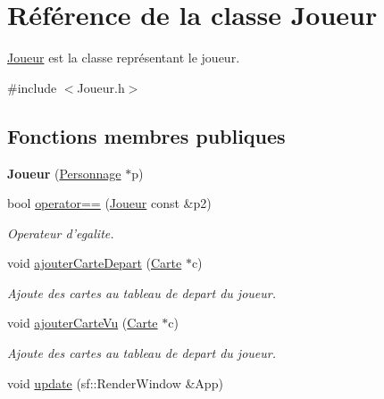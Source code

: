 \hypertarget{classJoueur}{\section{\-Référence de la classe \-Joueur}
\label{classJoueur}
}


\hyperlink{classJoueur}{\-Joueur} est la classe représentant le joueur.  




{\ttfamily \#include $<$\-Joueur.\-h$>$}

\subsection*{\-Fonctions membres publiques}
\begin{DoxyCompactItemize}
\item 
\hypertarget{classJoueur_ab45361d82a16b0a7ed98eb60de042869}{{\bfseries \-Joueur} (\hyperlink{classPersonnage}{\-Personnage} $\ast$p)}\label{classJoueur_ab45361d82a16b0a7ed98eb60de042869}

\item 
bool \hyperlink{classJoueur_aad26191834416db216c91ae6e3139d5c}{operator==} (\hyperlink{classJoueur}{\-Joueur} const \&p2)
\begin{DoxyCompactList}\small\item\em \-Operateur d'egalite. \end{DoxyCompactList}\item 
void \hyperlink{classJoueur_a500c9f3b5901d65093e294a451e462f5}{ajouter\-Carte\-Depart} (\hyperlink{classCarte}{\-Carte} $\ast$c)
\begin{DoxyCompactList}\small\item\em \-Ajoute des cartes au tableau de depart du joueur. \end{DoxyCompactList}\item 
void \hyperlink{classJoueur_a2bd5750fd43f489a3ed03aea01eb6e2e}{ajouter\-Carte\-Vu} (\hyperlink{classCarte}{\-Carte} $\ast$c)
\begin{DoxyCompactList}\small\item\em \-Ajoute des cartes au tableau de depart du joueur. \end{DoxyCompactList}\item 
\hypertarget{classJoueur_a76219fe05bcb3bf5bd42f651a1a3c882}{void \hyperlink{classJoueur_a76219fe05bcb3bf5bd42f651a1a3c882}{update} (sf\-::\-Render\-Window \&\-App)}\label{classJoueur_a76219fe05bcb3bf5bd42f651a1a3c882}


\end{DoxyCompactItemize}
